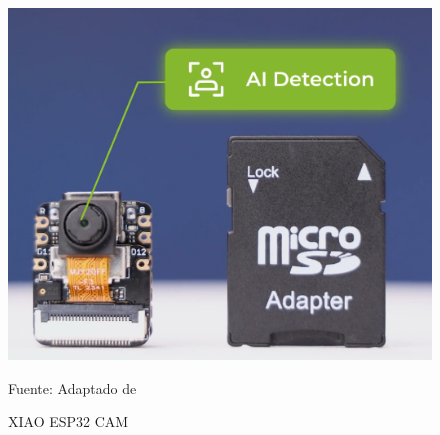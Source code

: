 \begin{figure}[htb]
    \centering
    \includegraphics[scale = 0.50]{Imagenes/xiao esp32cam.png}
    \caption{XIAO ESP32 CAM}{Fuente: Adaptado de~\cite{foto_xiao}}
\end{figure}
